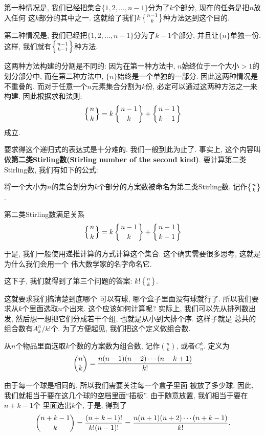 第一种情况是, 我们已经把集合$\{1,2,\ldots,{n-1}\}$分为了$k$个部分, 现在的任务是把$n$放入任何
这$k$部分的其中之一. 这就给了我们$k\left\{{n-1 \atop k}\right\}$种方法达到这个目的. 

第二种情况是, 我们已经把$\{1,2,\ldots,{n-1}\}$分为了$k-1$个部分, 并且让$\{n\}$单独一份. 
这样, 我们就有$\left\{{n-1 \atop k-1}\right\}$种方法. 

这两种方法构建的分割是不同的: 因为在第一种方法中, $n$始终位于一个大小$>1$的划分部分中, 
而在第二种方法中, $\{n\}$始终是一个单独的一部分. 因此这两种情况是不重叠的. 
而对于任意一个$n$元素集合分割为$k$份, 必定可以通过这两种方法之一来构建. 因此根据求和法则: 
$$
\left\{{n \atop k}\right\}=k\left\{{n-1 \atop k}\right\}+\left\{{n-1 \atop k-1}\right\}
$$
成立. 

要求得这个递归式的表达式是十分难的. 我们一般到此为止了. 事实上, 这个内容叫做{\textbf{第二类Stirling数(Stirling number of the second kind)}}. 
要计算第二类Stirling数, 我们有如下的公式: 

\begin{definition}[第二类Stirling数]
  将一个大小为$n$的集合划分为$k$个部分的方案数被命名为第二类Stirling数. 记作$\left\{{n \atop k}\right\}$. 
\end{definition}

\begin{theorem}
  第二类Stirling数满足关系
  $$
  \left\{{n \atop k}\right\}=k\left\{{n-1 \atop k}\right\}+\left\{{n-1 \atop k-1}\right\}
  $$
\end{theorem}

于是, 我们一般使用递推计算的方式计算这个集合. 这个确实需要很多思考, 这就是为什么我们会用一个
伟大数学家的名字命名它. 

这下子, 我们就得到了第三个问题的答案: $k! \left\{{n \atop k}\right\}$. 

 这就要求我们搞清楚到底哪个
可以有球, 哪个盒子里面没有球就行了. 所以我们要求从$k$个里面选取$n$个出来. 这个应该如何计算呢? 
实际上, 我们可以先从排列数出发, 然后想一想把它们分成若干个组, 也就是从小到大排个序. 这样子就是
总共的组合数有$A_k^n/k!$个. 为了方便起见, 我们把这个定义做组合数. 

\begin{definition}[组合数]
  从$n$个物品里面选取$k$个数的方案数为组合数, 记作${n\choose k}$, 或者$C_n^k$. 定义为
  $$
  {n\choose k}={n(n-1)(n-2)\cdots(n-k+1)\over k!}
  $$
\end{definition}


 由于每一个球是相同的, 所以我们需要关注每一个盒子里面
被放了多少球. 因此, 我们就相当于要在这几个球的空档里面``插板''. 由于随意放置, 我们相当于要在$n+k-1$个
里面选出$k$个, 于是, 得到了
$$
{n+k-1\choose k} = \frac{(n+k-1)!}{k!(n-1)!} = {n(n+1)(n+2)\cdots(n+k-1)\over k!}.
$$

